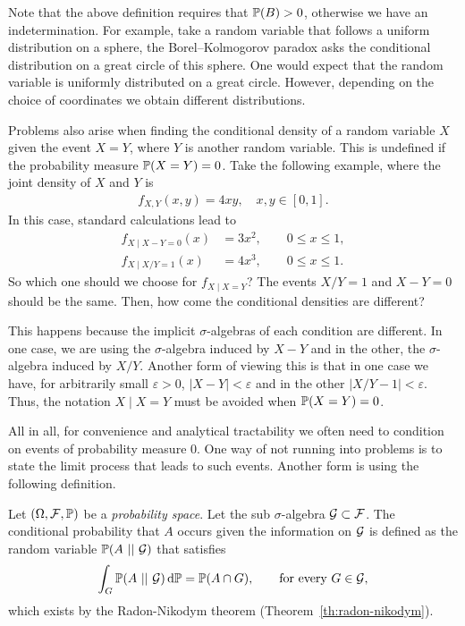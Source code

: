 Note that the above definition requires that $\P(B)>0$, otherwise we have an indetermination.
%
For example, take a random variable that follows a uniform distribution on a sphere, the Borel--Kolmogorov paradox \cite{kolmogorov1956probability} asks the conditional distribution on a great circle of this sphere.
%
One would expect that the random variable is uniformly distributed on a great circle. However, depending on the choice of coordinates we obtain different distributions.

Problems also arise when finding the conditional density of a random variable $X$ given the event $X=Y$, where $Y$ is another random variable. This is undefined if the probability measure $\P(X=Y) = 0$.
%
Take the following example, where the joint density of $X$ and $Y$ is
\begin{align*}
    f_{X,Y}(x,y) = 4xy, \quad x,y\in[0,1].
\end{align*}
In this case, standard calculations lead to
\begin{align*}
    f_{X\mid X-Y = 0}(x) &= 3x^2, \quad \quad 0\le x\le 1,\\
    f_{X\mid X/Y = 1}(x) &= 4x^3, \quad \quad 0\le x\le 1.
\end{align*}
So which one should we choose for $f_{X\mid X=Y}$?
%
The events $X/Y = 1$ and $X - Y = 0$ should be the same. Then, how come the conditional densities are different?

This happens because the implicit $\sigma$-algebras of each condition are different. In one case, we are using the $\sigma$-algebra induced by $X-Y$ and in the other, the $\sigma$-algebra induced by $X/Y$.
%
Another form of viewing this is that in one case we have, for arbitrarily small $\varepsilon > 0$, $|X-Y|<\varepsilon$ and in the other $|X/Y - 1| < \varepsilon$.
%
Thus, the notation $X\mid X=Y$ must be avoided when $\P(X=Y) = 0$.

All in all, for convenience and analytical tractability we often need to condition on events of probability measure $0$. One way of not running into problems is to state the limit process that leads to such events.
%
Another form is using the following definition.

\begin{definition} \label{def:cond_prob_sig}
    Let $(\Omega,\cal{F},\P)$ be a \textit{probability space}. Let the sub $\sigma$-algebra $\cal G\subset\cal F$.
    The conditional probability that $A$ occurs given the information on $\cal{G}$ is defined as the random variable $\P(A~||~\cal G)$ that satisfies
    \begin{align*}
        \int_{G} \P(A~||~\cal G)\,\d\P = \P(A \cap G), \qquad\text{for every }G\in\cal{G},
    \end{align*}
    which exists by the Radon-Nikodym theorem (Theorem~\ref{th:radon-nikodym}).
\end{definition}

